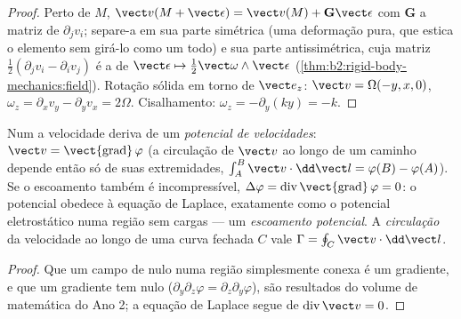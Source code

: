 \begin{proof}
Perto de $M$, $\vect v(M + \vect\epsilon) = \vect v(M) + \mathbf G\vect\epsilon$ com
$\mathbf G$ a matriz de $\partial_jv_i$; separe-a em sua parte simétrica
(uma deformação pura, que estica o elemento sem girá-lo como um
todo) e sua parte antissimétrica, cuja matriz $\tfrac12(\partial_jv_i -
\partial_iv_j)$ é a de $\vect\epsilon \mapsto \tfrac12\vect\omega\wedge\vect\epsilon$
(\cref{thm:b2:rigid-body-mechanics:field}). Rotação sólida em torno de $\vect e_z$:
$\vect v = \Omega(-y, x, 0)$, $\omega_z = \partial_xv_y - \partial_yv_x = 2\Omega$.
Cisalhamento: $\omega_z = -\partial_y(ky) = -k$.
\end{proof}

\begin{definition}\label{def:b2:fluid-kinematics:potential}
Num  a velocidade deriva de um \emph{potencial
de velocidades}: $\vect v = \operatorname{\vect{grad}}\varphi$ (a circulação
de $\vect v$ ao longo de um caminho depende então só de suas extremidades, $\int_A^B\vect v
\cdot\dd\vect l = \varphi(B) - \varphi(A)$). Se o escoamento também é
incompressível, $\Delta\varphi = \operatorname{div}\operatorname{\vect{grad}}
\varphi = 0$: o potencial obedece à equação de Laplace, exatamente como o
potencial eletrostático numa região sem cargas --- um \emph{escoamento
potencial}. A \emph{circulação} da velocidade ao longo de uma curva fechada $C$
vale $\Gamma = \oint_C\vect v\cdot\dd\vect l$.
\end{definition}

\begin{proof}
Que um campo de  nulo numa região simplesmente conexa é um gradiente, e
que um gradiente tem  nulo ($\partial_y\partial_z\varphi = \partial_z\partial_y\varphi$),
são resultados do volume de matemática do Ano 2; a equação de Laplace segue de
$\operatorname{div}\vect v = 0$.
\end{proof}

